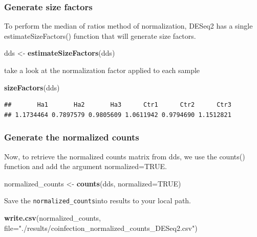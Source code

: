 \documentclass[
]{article}
\newenvironment{Shaded}{\begin{snugshade}}{\end{snugshade}}
\newcommand{\AttributeTok}[1]{\textcolor[rgb]{0.13,0.29,0.53}{#1}}
\newcommand{\ConstantTok}[1]{\textcolor[rgb]{0.56,0.35,0.01}{#1}}
\newcommand{\FunctionTok}[1]{\textcolor[rgb]{0.13,0.29,0.53}{\textbf{#1}}}
\newcommand{\NormalTok}[1]{#1}
\newcommand{\OtherTok}[1]{\textcolor[rgb]{0.56,0.35,0.01}{#1}}
\newcommand{\StringTok}[1]{\textcolor[rgb]{0.31,0.60,0.02}{#1}}
\begin{document}
\subsubsection{Generate size factors}\label{generate-size-factors}

To perform the median of ratios method of normalization, DESeq2 has a
single estimateSizeFactors() function that will generate size factors.

\begin{Shaded}
\begin{Highlighting}[]
\NormalTok{dds }\OtherTok{\textless{}{-}} \FunctionTok{estimateSizeFactors}\NormalTok{(dds)}
\end{Highlighting}
\end{Shaded}

take a look at the normalization factor applied to each sample

\begin{Shaded}
\begin{Highlighting}[]
\FunctionTok{sizeFactors}\NormalTok{(dds)}
\end{Highlighting}
\end{Shaded}

\begin{verbatim}
##       Ha1       Ha2       Ha3      Ctr1      Ctr2      Ctr3 
## 1.1734464 0.7897579 0.9805609 1.0611942 0.9794690 1.1512821
\end{verbatim}

\subsubsection{Generate the normalized
counts}\label{generate-the-normalized-counts}

Now, to retrieve the normalized counts matrix from dds, we use the
counts() function and add the argument normalized=TRUE.

\begin{Shaded}
\begin{Highlighting}[]
\NormalTok{normalized\_counts }\OtherTok{\textless{}{-}} \FunctionTok{counts}\NormalTok{(dds, }\AttributeTok{normalized=}\ConstantTok{TRUE}\NormalTok{)}
\end{Highlighting}
\end{Shaded}

Save the \texttt{normalized\_counts}into results to your local path.

\begin{Shaded}
\begin{Highlighting}[]
\FunctionTok{write.csv}\NormalTok{(normalized\_counts, }\AttributeTok{file=}\StringTok{"./results/coinfection\_normalized\_counts\_DESeq2.csv"}\NormalTok{)}
\end{Highlighting}
\end{Shaded}
\end{document}
